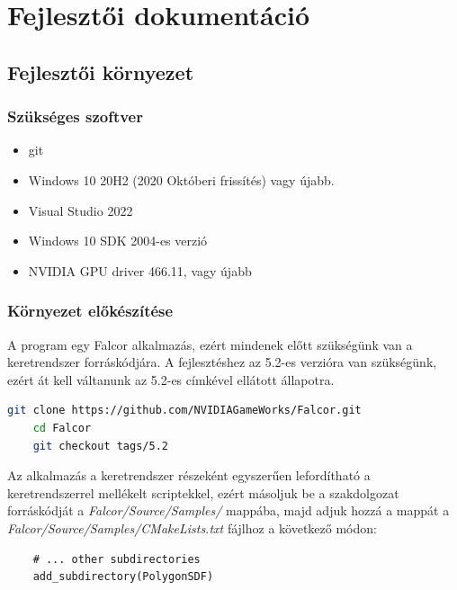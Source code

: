 \chapter{Fejlesztői dokumentáció}
\label{ch:impl}

\section{Fejlesztői környezet}

\subsection{Szükséges szoftver}

\begin{itemize}
    \item git
    \item Windows 10 20H2 (2020 Októberi frissítés) vagy újabb.
    \item Visual Studio 2022
    \item Windows 10 SDK 2004-es verzió
    \item NVIDIA GPU driver 466.11, vagy újabb
\end{itemize}

\subsection{Környezet előkészítése}

A program egy Falcor alkalmazás, ezért mindenek előtt szükségünk van a keretrendszer forráskódjára. A fejlesztéshez az 5.2-es verzióra van szükségünk, ezért át kell váltanunk az 5.2-es címkével ellátott állapotra.

\begin{lstlisting}[language=bash]
	git clone https://github.com/NVIDIAGameWorks/Falcor.git
	cd Falcor
	git checkout tags/5.2
\end{lstlisting}

Az alkalmazás a keretrendszer részeként egyszerűen lefordítható a keretrendszerrel mellékelt scriptekkel, ezért másoljuk be a szakdolgozat forráskódját a \textit{Falcor/Source/Samples/} mappába, majd adjuk hozzá a mappát a \textit{Falcor/Source/Samples/CMakeLists.txt} fájlhoz a következő módon:
\begin{lstlisting}
	# ... other subdirectories
	add_subdirectory(PolygonSDF)
\end{lstlisting}


